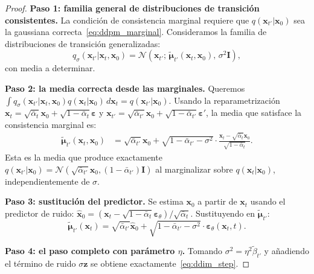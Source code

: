 \begin{proof}
\textbf{Paso 1: familia general de distribuciones de transición consistentes.}
La condición de consistencia marginal requiere que $q(\bm{x}_{t'}|\bm{x}_0)$
sea la gaussiana correcta~\eqref{eq:ddpm_marginal}. Consideramos la familia de
distribuciones de transición generalizadas:
\[
  q_\sigma(\bm{x}_{t'}|\bm{x}_t,\bm{x}_0)
  = \mathcal{N}\!\left(\bm{x}_{t'};\,\tilde{\bm{\mu}}_{t'}(\bm{x}_t,\bm{x}_0),\,
  \sigma^2\bm{I}\right),
\]
con media a determinar.

\textbf{Paso 2: la media correcta desde las marginales.}
Queremos $\int q_\sigma(\bm{x}_{t'}|\bm{x}_t,\bm{x}_0)q(\bm{x}_t|\bm{x}_0)
\,d\bm{x}_t = q(\bm{x}_{t'}|\bm{x}_0)$.
Usando la reparametrización $\bm{x}_t = \sqrt{\bar{\alpha}_t}\bm{x}_0 +
\sqrt{1-\bar{\alpha}_t}\bm{\varepsilon}$ y $\bm{x}_{t'} = \sqrt{\bar{\alpha}_{t'}}
\bm{x}_0 + \sqrt{1-\bar{\alpha}_{t'}}\bm{\varepsilon}'$, la media que satisface
la consistencia marginal es:
\begin{align*}
  \tilde{\bm{\mu}}_{t'}(\bm{x}_t,\bm{x}_0)
  &= \sqrt{\bar{\alpha}_{t'}}\bm{x}_0
  + \sqrt{1-\bar{\alpha}_{t'}-\sigma^2}\cdot\frac{\bm{x}_t
  - \sqrt{\bar{\alpha}_t}\bm{x}_0}{\sqrt{1-\bar{\alpha}_t}}.
\end{align*}
Esta es la media que produce exactamente $q(\bm{x}_{t'}|\bm{x}_0) =
\mathcal{N}(\sqrt{\bar{\alpha}_{t'}}\bm{x}_0,(1-\bar{\alpha}_{t'})\bm{I})$
al marginalizar sobre $q(\bm{x}_t|\bm{x}_0)$, independientemente de $\sigma$.

\textbf{Paso 3: sustitución del predictor.}
Se estima $\bm{x}_0$ a partir de $\bm{x}_t$ usando el predictor de ruido:
$\hat{\bm{x}}_0 = (\bm{x}_t - \sqrt{1-\bar{\alpha}_t}\bm{\varepsilon}_\theta)/
\sqrt{\bar{\alpha}_t}$.
Sustituyendo en $\tilde{\bm{\mu}}_{t'}$:
\[
  \tilde{\bm{\mu}}_{t'}(\bm{x}_t)
  = \sqrt{\bar{\alpha}_{t'}}\hat{\bm{x}}_0
  + \sqrt{1-\bar{\alpha}_{t'}-\sigma^2}
  \cdot\bm{\varepsilon}_\theta(\bm{x}_t,t).
\]

\textbf{Paso 4: el paso completo con parámetro $\eta$.}
Tomando $\sigma^2 = \eta^2\tilde{\beta}_{t'}$ y añadiendo el término de ruido
$\sigma\bm{z}$ se obtiene exactamente~\eqref{eq:ddim_step}.


\end{proof}
